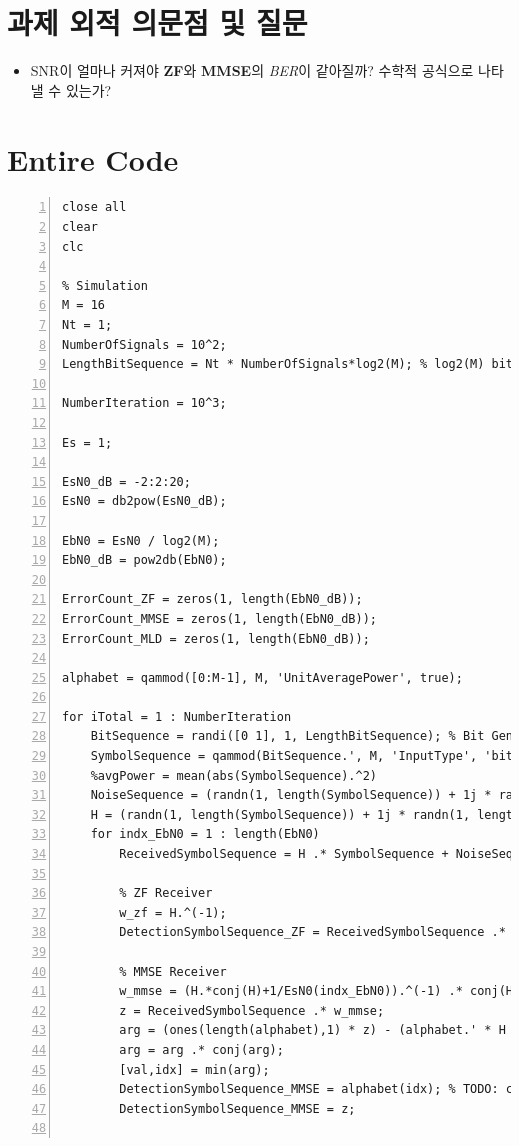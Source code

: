 \documentclass{article}
\newcommand{\bd}{\textbf} %
\begin{document}
\section{과제 외적 의문점 및 질문}
\begin{itemize}
  \item SNR이 얼마나 커져야 \bd{ZF}와 \bd{MMSE}의 \textsl{BER}이 같아질까? 수학적 공식으로 나타낼 수 있는가?
\end{itemize}
\section{Entire Code}
\begin{lstlisting}[style=Matlab-editor, frame=single, numbers=left,]
close all
clear
clc

% Simulation
M = 16
Nt = 1;
NumberOfSignals = 10^2;
LengthBitSequence = Nt * NumberOfSignals*log2(M); % log2(M) bits per signal

NumberIteration = 10^3;

Es = 1;

EsN0_dB = -2:2:20;
EsN0 = db2pow(EsN0_dB);

EbN0 = EsN0 / log2(M);
EbN0_dB = pow2db(EbN0);

ErrorCount_ZF = zeros(1, length(EbN0_dB));
ErrorCount_MMSE = zeros(1, length(EbN0_dB));
ErrorCount_MLD = zeros(1, length(EbN0_dB));

alphabet = qammod([0:M-1], M, 'UnitAveragePower', true);

for iTotal = 1 : NumberIteration
    BitSequence = randi([0 1], 1, LengthBitSequence); % Bit Generation (BitSequence = rand(1, LengthBitSequence) > 0.5;)
    SymbolSequence = qammod(BitSequence.', M, 'InputType', 'bit', 'UnitAveragePower', 1).';
    %avgPower = mean(abs(SymbolSequence).^2)
    NoiseSequence = (randn(1, length(SymbolSequence)) + 1j * randn(1, length(SymbolSequence))) / sqrt(2); % Noise (n) Generation
    H = (randn(1, length(SymbolSequence)) + 1j * randn(1, length(SymbolSequence))) ./ sqrt(2); % Channel (h) Generation
    for indx_EbN0 = 1 : length(EbN0)
        ReceivedSymbolSequence = H .* SymbolSequence + NoiseSequence * sqrt(1 / EsN0(indx_EbN0)); % Received Signal (y = s + n) Generation

        % ZF Receiver
        w_zf = H.^(-1);
        DetectionSymbolSequence_ZF = ReceivedSymbolSequence .* w_zf; % Detection (Zero-Forcing: y / h)

        % MMSE Receiver
        w_mmse = (H.*conj(H)+1/EsN0(indx_EbN0)).^(-1) .* conj(H);
        z = ReceivedSymbolSequence .* w_mmse;
        arg = (ones(length(alphabet),1) * z) - (alphabet.' * H .* w_mmse);
        arg = arg .* conj(arg);
        [val,idx] = min(arg);
        DetectionSymbolSequence_MMSE = alphabet(idx); % TODO: could possibly simplify it more
        DetectionSymbolSequence_MMSE = z;
        

\end{lstlisting}
\end{document}

